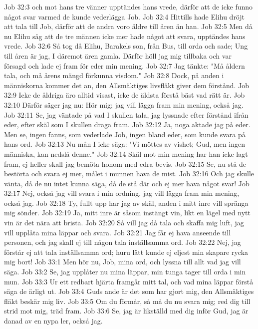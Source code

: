 Job 32:3  och mot hans tre vänner upptändes hans vrede, därför att de icke funno något svar varmed de kunde vederlägga Job.
Job 32:4  Hittills hade Elihu dröjt att tala till Job, därför att de andra voro äldre till åren än han.
Job 32:5  Men då nu Elihu såg att de tre männen icke mer hade något att svara, upptändes hans vrede.
Job 32:6  Så tog då Elihu, Barakels son, från Bus, till orda och sade; Ung till åren är jag, I däremot ären gamla. Därför höll jag mig tillbaka och var försagd och lade ej fram för eder min mening.
Job 32:7  Jag tänkte: "Må åldern tala, och må årens mängd förkunna visdom."
Job 32:8  Dock, på anden i människorna kommer det an, den Allsmäktiges livsfläkt giver dem förstånd.
Job 32:9  Icke de åldriga äro alltid visast, icke de äldsta förstå bäst vad rätt är.
Job 32:10  Därför säger jag nu: Hör mig; jag vill lägga fram min mening, också jag.
Job 32:11  Se, jag väntade på vad I skullen tala, jag lyssnade efter förstånd ifrån eder, efter skäl som I skullen draga fram.
Job 32:12  Ja, noga aktade jag på eder. Men se, ingen fanns, som vederlade Job, ingen bland eder, som kunde svara på hans ord.
Job 32:13  Nu mån I icke säga: "Vi möttes av vishet; Gud, men ingen människa, kan nedslå denne."
Job 32:14  Skäl mot min mening har han icke lagt fram, ej heller skall jag bemöta honom med edra bevis.
Job 32:15  Se, nu stå de bestörta och svara ej mer, målet i munnen hava de mist.
Job 32:16  Och jag skulle vänta, då de nu intet kunna säga, då de stå där och ej mer hava något svar!
Job 32:17  Nej, också jag vill svara i min ordning, jag vill lägga fram min mening, också jag.
Job 32:18  Ty, fullt upp har jag av skäl, anden i mitt inre vill spränga mig sönder.
Job 32:19  Ja, mitt inre är såsom instängt vin, likt en lägel med nytt vin är det nära att brista.
Job 32:20  Så vill jag då tala och skaffa mig luft, jag vill upplåta mina läppar och svara.
Job 32:21  Jag får ej hava anseende till personen, och jag skall ej till någon tala inställsamma ord.
Job 32:22  Nej, jag förstår ej att tala inställsamma ord; huru lätt kunde ej eljest min skapare rycka mig bort!
Job 33:1  Men hör nu, Job, mina ord, och lyssna till allt vad jag vill säga.
Job 33:2  Se, jag upplåter nu mina läppar, min tunga tager till orda i min mun.
Job 33:3  Ur ett redbart hjärta framgår mitt tal, och vad mina läppar förstå säga de ärligt ut.
Job 33:4  Guds ande är det som har gjort mig, den Allsmäktiges fläkt beskär mig liv.
Job 33:5  Om du förmår, så må du nu svara mig; red dig till strid mot mig, träd fram.
Job 33:6  Se, jag är likställd med dig inför Gud, jag är danad av en nypa ler, också jag.
